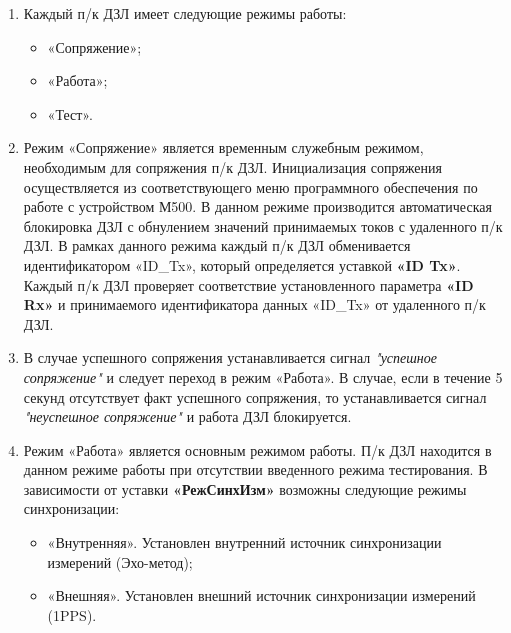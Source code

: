 \begin{enumerate}[label=\arabic{section}.\arabic{subsection}.\arabic{enumi}, labelsep=4pt, leftmargin=0pt, itemindent=57pt, itemsep=0pt, parsep=5pt]
\begin{enumerate}[label=\arabic{section}.\arabic{subsection}.\arabic{enumi}.\arabic*, labelsep=4pt, leftmargin=0em, itemindent=65pt, parsep=0pt]

\item
Каждый п/к ДЗЛ имеет следующие режимы работы:
\begin{itemize} 
\item «Сопряжение»;
\item «Работа»;
\item «Тест».
\end{itemize}

\item
Режим «Сопряжение» является временным служебным режимом, необходимым для сопряжения п/к ДЗЛ.
Инициализация сопряжения осуществляется из соответствующего меню программного обеспечения по работе с устройством М500.
В данном режиме производится автоматическая блокировка ДЗЛ с обнулением значений принимаемых токов с удаленного п/к ДЗЛ.
В рамках данного режима каждый п/к ДЗЛ обменивается идентификатором «ID\_Tx», который определяется уставкой \textbf{«ID Tx»}.
Каждый п/к ДЗЛ проверяет соответствие установленного параметра \textbf{«ID Rx»} и принимаемого идентификатора данных «ID\_Tx» от удаленного п/к ДЗЛ. 

\item
В случае успешного сопряжения устанавливается сигнал \textit{"успешное сопряжение"} и следует переход в режим «Работа».
В случае, если в течение 5 секунд отсутствует факт успешного сопряжения, то устанавливается сигнал \textit{"неуспешное сопряжение"} и работа ДЗЛ блокируется.

\item
Режим «Работа» является основным режимом работы.
П/к ДЗЛ находится в данном режиме работы при отсутствии введенного режима тестирования.
В зависимости от уставки \textbf{«РежСинхИзм»} возможны следующие режимы синхронизации:
\begin{itemize} 
\item «Внутренняя». Установлен внутренний источник синхронизации измерений (Эхо-метод);
\item «Внешняя». Установлен внешний источник синхронизации измерений (1PPS).
\end{itemize}


\end{enumerate}
\end{enumerate}
